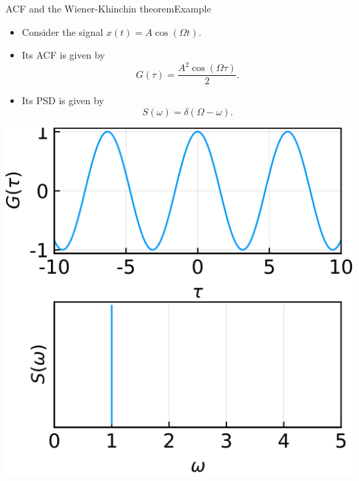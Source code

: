 \documentclass[usenames,dvipsnames,svgnames,10pt,aspectratio=169]{beamer}
\begin{document}
\begin{frame}[t, c]{ACF and the Wiener-Khinchin theorem}{Example}
	\begin{minipage}{.48\textwidth}
		\begin{itemize}
			\item Consider the signal $x(t) = A \cos(\Omega t)$.

			\medskip

			\item Its ACF is given by
			$$
			G(\tau) = \frac{A^2 \cos(\Omega \tau)}{2}.
			$$

			\item Its PSD is given by
			$$
			S(\omega) = \delta(\Omega - \omega).
			$$
		\end{itemize}
	\end{minipage}%
	\hfill
	\begin{minipage}{.48\textwidth}
		\centering
		\includegraphics[width=.75\columnwidth]{cosine_acf_psd}
	\end{minipage}

	\vspace{1cm}
\end{frame}
\end{document}
